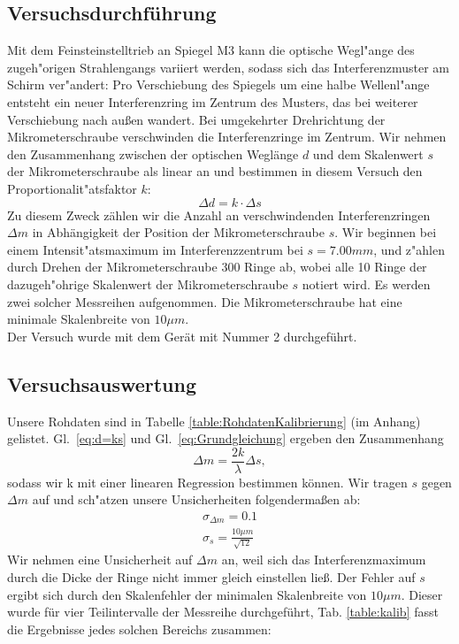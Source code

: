 \documentclass[12pt,a4paper]{article}
\begin{document}
\subsection{Versuchsdurchführung}
Mit dem Feinsteinstelltrieb an Spiegel M3 kann die optische Wegl"ange des zugeh"origen Strahlengangs variiert werden, sodass sich das Interferenzmuster am Schirm ver"andert: Pro Verschiebung des Spiegels um eine halbe Wellenl"ange entsteht ein neuer Interferenzring im Zentrum des Musters, das bei weiterer Verschiebung nach au\ss en wandert. Bei umgekehrter Drehrichtung der Mikrometerschraube verschwinden die Interferenzringe im Zentrum. Wir nehmen den Zusammenhang zwischen der optischen Weglänge $d$ und dem Skalenwert $s$ der Mikrometerschraube als linear an und bestimmen in diesem Versuch den Proportionalit"atsfaktor $k$:
\begin{equation}\label{eq:d=ks}
\Delta d=k\cdot \Delta s
\end{equation}
Zu diesem Zweck zählen wir die Anzahl an verschwindenden Interferenzringen $\Delta m$ in Abhängigkeit der Position der Mikrometerschraube $s$.
Wir beginnen bei einem Intensit"atsmaximum im Interferenzzentrum bei $s=7.00mm$, und z"ahlen durch Drehen der Mikrometerschraube 300 Ringe ab, wobei alle 10 Ringe der dazugeh"ohrige Skalenwert der Mikrometerschraube $s$ notiert wird. Es werden zwei solcher Messreihen aufgenommen. Die Mikrometerschraube hat eine minimale Skalenbreite von $10\mu m$.\\
Der Versuch wurde mit dem Gerät mit Nummer 2 durchgeführt.

\subsection{Versuchsauswertung}
Unsere Rohdaten sind in Tabelle \ref{table:RohdatenKalibrierung} (im Anhang) gelistet.
Gl.~\eqref{eq:d=ks} und Gl.~\eqref{eq:Grundgleichung} ergeben den Zusammenhang
\begin{equation}
\Delta m = \frac{2k}{\lambda}\Delta s,
\end{equation}
sodass wir k mit einer linearen Regression bestimmen können. Wir tragen $s$ gegen $\Delta m$ auf und sch"atzen unsere Unsicherheiten folgendermaßen ab:
\begin{align}\label{eq:Unsicherheit_Kalibrierung}
\sigma_{\Delta m}=0.1\\
\sigma_s=\frac{10\mu m}{\sqrt{12}}
\end{align}
Wir nehmen eine Unsicherheit auf $\Delta m$ an, weil sich das Interferenzmaximum durch die Dicke der Ringe nicht immer gleich einstellen lie\ss. Der Fehler auf $s$ ergibt sich durch den Skalenfehler der minimalen Skalenbreite von $10\mu m$. Dieser wurde für vier Teilintervalle der Messreihe durchgeführt, Tab. \ref{table:kalib} fasst die Ergebnisse jedes solchen Bereichs zusammen:\\
\end{document}
